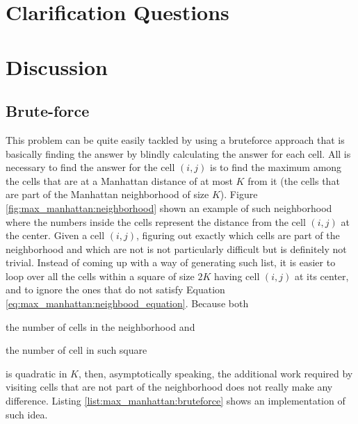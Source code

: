 \section{Clarification Questions}

\begin{QandA}
	\item 
	\begin{answered}
		\textit{}
	\end{answered}
	
\end{QandA}

\section{Discussion}
\label{max_manhattan:sec:discussion}

\subsection{Brute-force}
\label{max_manhattan:sec:bruteforce}
This problem can be quite easily tackled by using a bruteforce approach that is basically finding the answer 
by blindly calculating the answer for each cell. 
All is necessary to find the answer for the cell $(i,j)$ is to find the maximum among the cells that are 
at a Manhattan distance of at most $K$ from it (the cells that are part of the Manhattan neighborhood of size $K$).
Figure \ref{fig:max_manhattan:neighborhood} shown an example of such neighborhood where the numbers inside the
cells represent the distance from the cell $(i,j)$ at the center. 
Given a cell $(i,j)$, figuring out exactly which cells are part of the neighborhood and which are not
is not particularly difficult but is definitely not trivial. 
Instead of coming up with a way of generating such list, it is easier to loop over all the cells within
a square of size $2K$ having cell $(i,j)$ at its center, and to ignore the ones that do not satisfy Equation \ref{eq:max_manhattan:neighbood_equation}.
Because both 
\begin{enumerate*}
	\item the number of cells in the neighborhood and 
	\item the number of cell in such square
\end{enumerate*} is quadratic in $K$, 
then, asymptotically speaking, the additional work required by visiting cells that are not part of the neighborhood
does not really make any difference. Listing \ref{list:max_manhattan:bruteforce} shows an implementation of such idea. 
